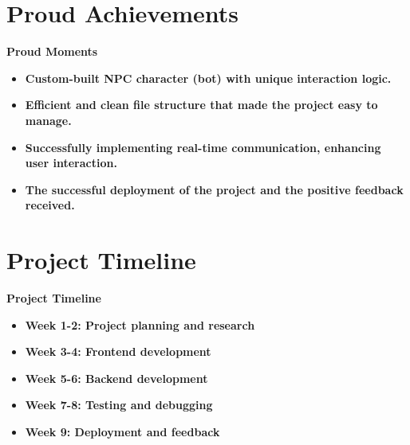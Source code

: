 \documentclass{beamer}
\begin{document}
\section{Proud Achievements}

\begin{frame}{\bfseries Proud Moments}
    \begin{itemize}
        \item \bfseries Custom-built NPC character (bot) with unique interaction logic.
        \item \bfseries Efficient and clean file structure that made the project easy to manage.
        \item \bfseries Successfully implementing real-time communication, enhancing user interaction.
        \item \bfseries The successful deployment of the project and the positive feedback received.
    \end{itemize}
\end{frame}

\section{Project Timeline}

\begin{frame}{\bfseries Project Timeline}
    \begin{itemize}
        \item \bfseries Week 1-2: Project planning and research
        \item \bfseries Week 3-4: Frontend development
        \item \bfseries Week 5-6: Backend development
        \item \bfseries Week 7-8: Testing and debugging
        \item \bfseries Week 9: Deployment and feedback
    \end{itemize}
\end{frame}
\end{document}
